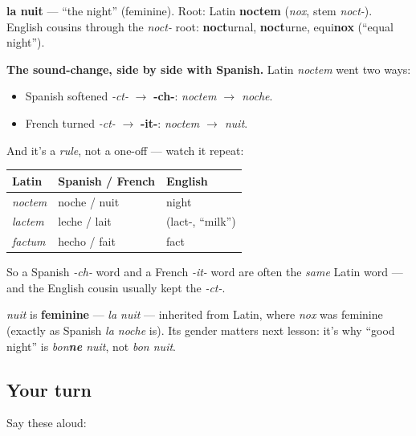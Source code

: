 \begin{cousinweb}
\textbf{la nuit} — \textquotedblleft{}the night\textquotedblright{} (feminine). Root: Latin \textbf{noctem} (\emph{nox}, stem \emph{noct-}). English cousins through the \emph{noct-} root: \textbf{noct}urnal, \textbf{noct}urne, equi\textbf{nox} (\textquotedblleft{}equal night\textquotedblright{}).

\textbf{The sound-change, side by side with Spanish.} Latin \emph{noctem} went two ways:

\begin{itemize}
\raggedright
  \item Spanish softened \emph{-ct-} $\to$ \textbf{-ch-}: \emph{noctem $\to$ noche}.
  \item French turned \emph{-ct-} $\to$ \textbf{-it-}: \emph{noctem $\to$ nuit}.
\end{itemize}

And it's a \emph{rule}, not a one-off — watch it repeat:

\noindent
\begin{tabularx}{\linewidth}{@{}>{\raggedright\arraybackslash}X>{\raggedright\arraybackslash}X>{\raggedright\arraybackslash}X@{}}
\toprule
\textbf{Latin} & \textbf{Spanish / French} & \textbf{English} \\
\midrule
\emph{noctem} & noche / nuit & night \\
\emph{lactem} & leche / lait & (lact-, \textquotedblleft{}milk\textquotedblright{}) \\
\emph{factum} & hecho / fait & fact \\
\bottomrule
\end{tabularx}

So a Spanish \emph{-ch-} word and a French \emph{-it-} word are often the \emph{same} Latin word — and the English cousin usually kept the \emph{-ct-}.
\end{cousinweb}

\begin{grammarlens}[title={Grammar Lens}]
\emph{nuit} is \textbf{feminine} — \emph{la nuit} — inherited from Latin, where \emph{nox} was feminine (exactly as Spanish \emph{la noche} is). Its gender matters next lesson: it's why \textquotedblleft{}good night\textquotedblright{} is \emph{bon\textbf{ne} nuit}, not \emph{bon nuit}.
\end{grammarlens}

\subsection*{Your turn}
Say these aloud:

